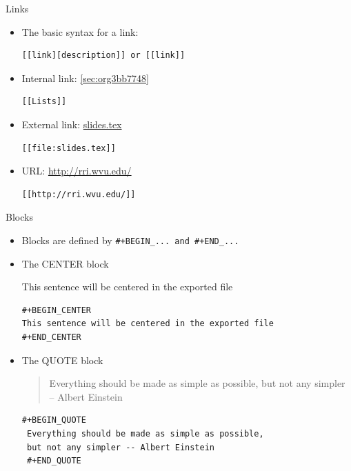 \documentclass[presentation]{beamer}
\begin{document}
\begin{frame}[fragile,label={sec:orgd1c1236}]{Links}
 \begin{itemize}
\item The basic syntax for a link:
\begin{verbatim}
[[link][description]] or [[link]]
\end{verbatim}

\item Internal link: \ref{sec:org3bb7748}
\begin{verbatim}
[[Lists]]
\end{verbatim}

\item External link: \url{slides.tex}
\begin{verbatim}
[[file:slides.tex]]
\end{verbatim}

\item URL: \url{http://rri.wvu.edu/}
\begin{verbatim}
[[http://rri.wvu.edu/]]
\end{verbatim}
\end{itemize}
\end{frame}

\begin{frame}[fragile,label={sec:org268962f}]{Blocks}
 \begin{itemize}
\item Blocks are defined by \texttt{\#+BEGIN\_... and \#+END\_...}

\item The CENTER block

\begin{center}
This sentence will be centered in the exported file
\end{center}

\begin{verbatim}
#+BEGIN_CENTER
This sentence will be centered in the exported file
#+END_CENTER
\end{verbatim}

\item The QUOTE block

\begin{quote}
Everything should be made as simple as possible,
but not any simpler -- Albert Einstein
\end{quote}

\begin{verbatim}
#+BEGIN_QUOTE
 Everything should be made as simple as possible,
 but not any simpler -- Albert Einstein
 #+END_QUOTE
\end{verbatim}
\end{itemize}
\end{frame}
\end{document}
